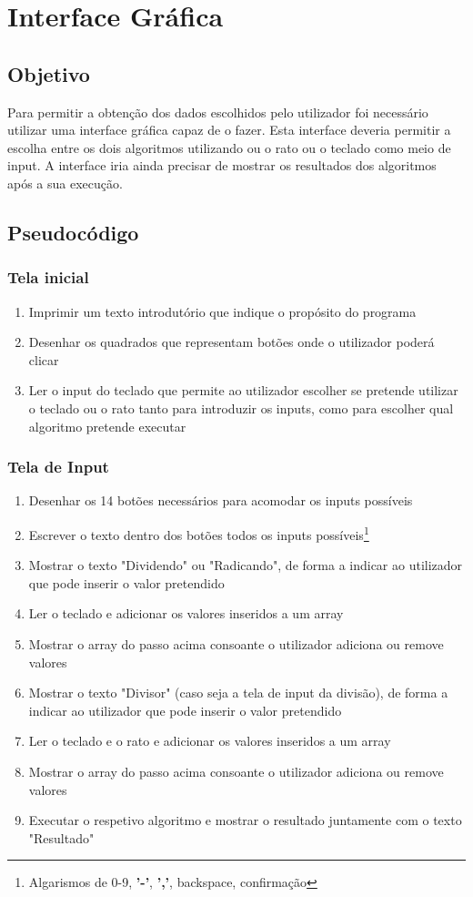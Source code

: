 \chapter{Interface Gráfica}
\setlength{\parindent}{0pt}

\section{Objetivo}
Para permitir a obtenção dos dados escolhidos pelo utilizador foi necessário utilizar uma interface gráfica capaz de o fazer. Esta interface deveria permitir a escolha entre os dois algoritmos utilizando ou o rato ou o teclado como meio de input. A interface iria ainda precisar de mostrar os resultados dos algoritmos após a sua execução.

\section{Pseudocódigo}
\subsection{Tela inicial}
	\begin{enumerate}
		\item Imprimir um texto introdutório que indique o propósito do programa
		\item Desenhar os quadrados que representam botões onde o utilizador poderá clicar
		\item Ler o input do teclado que permite ao utilizador escolher se pretende utilizar o teclado ou o rato tanto para introduzir os inputs, como para escolher qual algoritmo pretende executar
	\end{enumerate}
\subsection{Tela de Input}
\begin{enumerate}
	\item Desenhar os 14 botões necessários para acomodar os inputs possíveis 
	\item Escrever o texto dentro dos botões todos os inputs possíveis\footnote{Algarismos de 0-9, \textbf{'-'}, \textbf{','}, backspace, confirmação}
	\item Mostrar o texto "Dividendo" ou "Radicando", de forma a indicar ao utilizador que pode inserir o valor pretendido
	\item Ler o teclado e adicionar os valores inseridos a um array
	\item Mostrar o array do passo acima consoante o utilizador adiciona ou remove valores
	\item Mostrar o texto "Divisor" (caso seja a tela de input da divisão), de forma a indicar ao utilizador que pode inserir o valor pretendido
	\item Ler o teclado e o rato e adicionar os valores inseridos a um array
	\item Mostrar o array do passo acima consoante o utilizador adiciona ou remove valores
	\item Executar o respetivo algoritmo e mostrar o resultado juntamente com o texto "Resultado"\\
\end{enumerate}
\setcounter{footnote}{0} 
